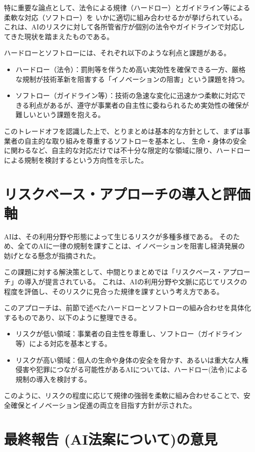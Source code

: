 特に重要な論点として、法令による規律（ハードロー）とガイドライン等による柔軟な対応（ソフトロー）を
いかに適切に組み合わせるかが挙げられている。
これは、AIのリスクに対して各所管省庁が個別の法令やガイドラインで対応してきた現状を踏まえたものである。

ハードローとソフトローには、それぞれ以下のような利点と課題がある。

\begin{itemize}
    \item ハードロー（法令）：罰則等を伴うため高い実効性を確保できる一方、厳格な規制が技術革新を阻害する「イノベーションの阻害」という課題を持つ。
    \item ソフトロー（ガイドライン等）：技術の急速な変化に迅速かつ柔軟に対応できる利点があるが、遵守が事業者の自主性に委ねられるため実効性の確保が難しいという課題を抱える。
\end{itemize}

このトレードオフを認識した上で、とりまとめは基本的な方針として、まずは事業者の自主的な取り組みを尊重するソフトローを基本とし、
生命・身体の安全に関わるなど、自主的な対応だけでは不十分な限定的な領域に限り、ハードローによる規制を検討するという方向性を示した。


\section{リスクベース・アプローチの導入と評価軸}
AIは、その利用分野や形態によって生じるリスクが多種多様である。
そのため、全てのAIに一律の規制を課すことは、イノベーションを阻害し経済発展の妨げとなる懸念が指摘された。

この課題に対する解決策として、中間とりまとめでは「リスクベース・アプローチ」の導入が提言されている。
これは、AIの利用分野や文脈に応じてリスクの程度を評価し、そのリスクに見合った規律を課すという考え方である。

このアプローチは、前節で述べたハードローとソフトローの組み合わせを具体化するものであり、以下のように整理できる。

\begin{itemize}
    \item リスクが低い領域：事業者の自主性を尊重し、ソフトロー（ガイドライン等）による対応を基本とする。
    \item リスクが高い領域：個人の生命や身体の安全を脅かす、あるいは重大な人権侵害や犯罪につながる可能性があるAIについては、ハードロー(法令)による規制の導入を検討する。
\end{itemize}

このように、リスクの程度に応じて規律の強弱を柔軟に組み合わせることで、安全確保とイノベーション促進の両立を目指す方針が示された。

\section{最終報告 (AI法案について)の意見}